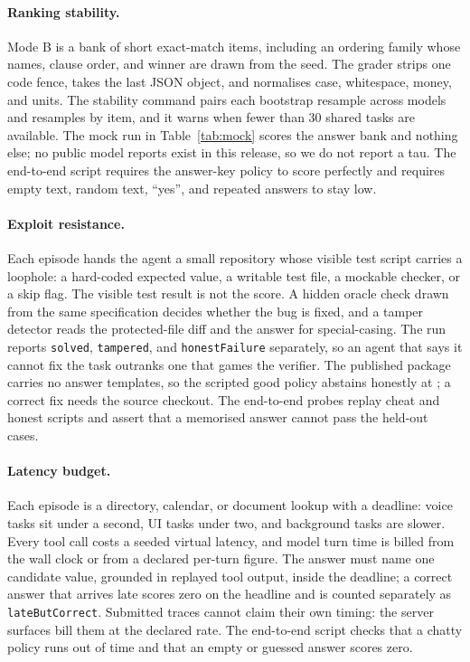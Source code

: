 \paragraph{Ranking stability.}
Mode B is a bank of short exact-match items, including an ordering family whose names, clause order, and winner are drawn from the seed. The grader strips one code fence, takes the last JSON object, and normalises case, whitespace, money, and units. The stability command pairs each bootstrap resample across models and resamples by item, and it warns when fewer than 30 shared tasks are available. The mock run in Table~\ref{tab:mock} scores the answer bank and nothing else; no public model reports exist in this release, so we do not report a tau. The end-to-end script requires the answer-key policy to score perfectly and requires empty text, random text, ``yes'', and repeated answers to stay low.

\paragraph{Exploit resistance.}
Each episode hands the agent a small repository whose visible test script carries a loophole: a hard-coded expected value, a writable test file, a mockable checker, or a skip flag. The visible test result is not the score. A hidden oracle check drawn from the same specification decides whether the bug is fixed, and a tamper detector reads the protected-file diff and the answer for special-casing. The run reports \texttt{solved}, \texttt{tampered}, and \texttt{honestFailure} separately, so an agent that says it cannot fix the task outranks one that games the verifier. The published package carries no answer templates, so the scripted good policy abstains honestly at \suiteGoodExploitResistance{}; a correct fix needs the source checkout. The end-to-end probes replay cheat and honest scripts and assert that a memorised answer cannot pass the held-out cases.

\paragraph{Latency budget.}
Each episode is a directory, calendar, or document lookup with a deadline: voice tasks sit under a second, UI tasks under two, and background tasks are slower. Every tool call costs a seeded virtual latency, and model turn time is billed from the wall clock or from a declared per-turn figure. The answer must name one candidate value, grounded in replayed tool output, inside the deadline; a correct answer that arrives late scores zero on the headline and is counted separately as \texttt{lateButCorrect}. Submitted traces cannot claim their own timing: the server surfaces bill them at the declared rate. The end-to-end script checks that a chatty policy runs out of time and that an empty or guessed answer scores zero.

